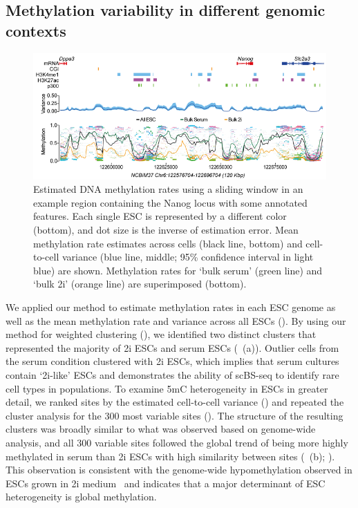 \subsection{Methylation variability in different genomic contexts} \label{sec:bs_results}

\begin{figure}[htbp!]
\centering
\includegraphics[width=1.0\textwidth]{zoom}
\caption[Estimated methylation rates for Nanog locus.]{Estimated DNA methylation rates using a sliding window in an example region containing the Nanog locus with some annotated features. Each single ESC is represented by a different color (bottom), and dot size is the inverse of estimation error. Mean methylation rate estimates across cells (black line, bottom) and cell-to-cell variance (blue line, middle; 95\% confidence interval in light blue) are shown. Methylation rates for `bulk serum' (green line) and `bulk 2i' (orange line) are superimposed (bottom).}
\label{fig:bs_zoom}
\end{figure}

We applied our method to estimate methylation rates in each ESC genome as well as the mean methylation rate and variance across all ESCs (). By using our method for weighted clustering (), we identified two distinct clusters that represented the majority of 2i ESCs and serum ESCs (~(a)). Outlier cells from the serum condition clustered with 2i ESCs, which implies that serum cultures contain `2i-like' ESCs and demonstrates the ability of scBS-seq to identify rare cell types in populations. To examine 5mC heterogeneity in ESCs in greater detail, we ranked sites by the estimated cell-to-cell variance () and repeated the cluster analysis for the 300 most variable sites (). The structure of the resulting clusters was broadly similar to what was observed based on genome-wide analysis, and all 300 variable sites followed the global trend of being more highly methylated in serum than 2i ESCs with high similarity between sites (~(b); ). This observation is consistent with the genome-wide hypomethylation observed in ESCs grown in 2i medium~\citep{ficz_fgf_2013} and indicates that a major determinant of ESC heterogeneity is global methylation.

